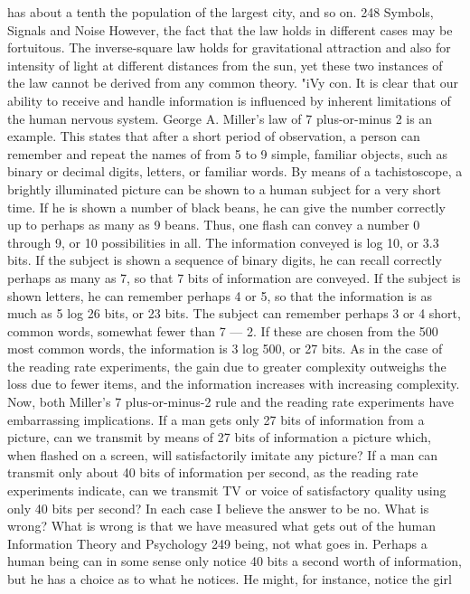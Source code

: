 {{{{{{{{{{{{has about a tenth the population of the largest city, and so on.
248
Symbols, Signals and Noise
However, the fact that the law holds in different cases may be
fortuitous. The inverse-square law holds for gravitational attraction
and also for intensity of light at different distances from the sun,
yet these two instances of the law cannot be derived from any
common theory. "iVy con.
It is clear that our ability to receive and handle information is
influenced by inherent limitations of the human nervous system.
George A. Miller’s law of 7 plus-or-minus 2 is an example. This
states that after a short period of observation, a person can remember
and repeat the names of from 5 to 9 simple, familiar objects,
such as binary or decimal digits, letters, or familiar words.
By means of a tachistoscope, a brightly illuminated picture can
be shown to a human subject for a very short time. If he is shown
a number of black beans, he can give the number correctly up to
perhaps as many as 9 beans. Thus, one flash can convey a number
0 through 9, or 10 possibilities in all. The information conveyed
is log 10, or 3.3 bits.
If the subject is shown a sequence of binary digits, he can recall
correctly perhaps as many as 7, so that 7 bits of information are
conveyed.
If the subject is shown letters, he can remember perhaps 4 or 5,
so that the information is as much as 5 log 26 bits, or 23 bits.
The subject can remember perhaps 3 or 4 short, common words,
somewhat fewer than 7 — 2. If these are chosen from the 500 most
common words, the information is 3 log 500, or 27 bits.
As in the case of the reading rate experiments, the gain due to
greater complexity outweighs the loss due to fewer items, and the
information increases with increasing complexity.
Now, both Miller’s 7 plus-or-minus-2 rule and the reading rate
experiments have embarrassing implications. If a man gets only 27
bits of information from a picture, can we transmit by means of
27 bits of information a picture which, when flashed on a screen,
will satisfactorily imitate any picture? If a man can transmit only
about 40 bits of information per second, as the reading rate experiments
indicate, can we transmit TV or voice of satisfactory quality
using only 40 bits per second?
In each case I believe the answer to be no. What is wrong? What
is wrong is that we have measured what gets out of the human
Information Theory and Psychology
249
being, not what goes in. Perhaps a human being can in some sense
only notice 40 bits a second worth of information, but he has a
choice as to what he notices. He might, for instance, notice the girl
}}}}}}}}}}}}
